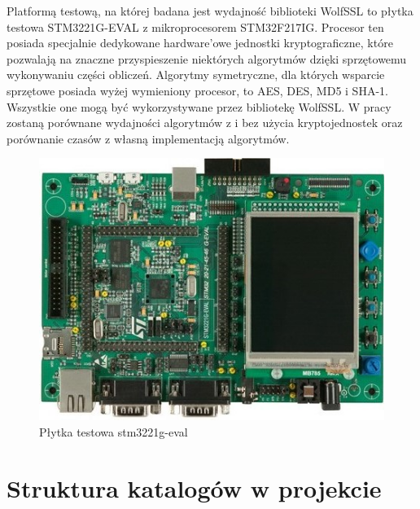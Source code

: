 \documentclass[oneside]{mgr}
\begin{document}
Platformą testową, na której badana jest wydajność biblioteki WolfSSL to płytka testowa STM3221G-EVAL z mikroprocesorem STM32F217IG. Procesor ten posiada specjalnie dedykowane hardware'owe jednostki kryptograficzne, które pozwalają na znaczne przyspieszenie niektórych algorytmów dzięki sprzętowemu wykonywaniu części obliczeń.  Algorytmy symetryczne, dla których wsparcie sprzętowe posiada wyżej wymieniony procesor, to AES, DES, MD5 i SHA-1. Wszystkie one mogą być wykorzystywane przez bibliotekę WolfSSL. W pracy zostaną porównane wydajności algorytmów z i bez użycia kryptojednostek oraz porównanie czasów z własną implementacją algorytmów.
\begin{center}
\begin{figure}[h]
\includegraphics[width = \textwidth]{stm3221g-eval}
\caption{Płytka testowa stm3221g-eval}
\end{figure}

\end{center}



\section{Struktura katalogów w projekcie}
\end{document}
